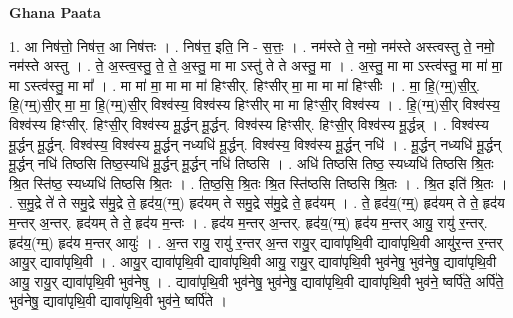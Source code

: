 \documentclass[17pt]{extarticle}
\begin{document}
\textbf{Ghana Paata } \newline

1. आ निष॑त्तो॒ निष॑त्त॒ आ निष॑त्तः । . निष॑त्त॒ इति॒ नि - स॒त्तः॒ । . नम॑स्ते ते॒ नमो॒ नम॑स्ते अस्त्वस्तु ते॒ नमो॒ नम॑स्ते अस्तु । . ते॒ अ॒स्त्व॒स्तु॒ ते॒ ते॒ अ॒स्तु॒ मा मा ऽस्तु॑ ते ते अस्तु॒ मा । . अ॒स्तु॒ मा मा ऽस्त्व॑स्तु॒ मा मा॑ मा॒ मा ऽस्त्व॑स्तु॒ मा मा᳚ । . मा मा॑ मा॒ मा मा मा॑ हिꣳसीर्. हिꣳसीर् मा॒ मा मा मा॑ हिꣳसीः । . मा॒ हि॒(ग्म्॒)सी॒र्॒. हि॒(ग्म्॒)सी॒र् मा॒ मा॒ हि॒(ग्म्॒)सी॒र् विश्व॑स्य॒ विश्व॑स्य हिꣳसीर् मा मा हिꣳसी॒र् विश्व॑स्य । . हि॒(ग्म्॒)सी॒र् विश्व॑स्य॒ विश्व॑स्य हिꣳसीर्. हिꣳसी॒र् विश्व॑स्य मू॒र्द्धन् मू॒र्द्धन्. विश्व॑स्य हिꣳसीर्. हिꣳसी॒र् विश्व॑स्य मू॒र्द्धन्न् । . विश्व॑स्य मू॒र्द्धन् मू॒र्द्धन्. विश्व॑स्य॒ विश्व॑स्य मू॒र्द्धन् नध्यधि॑ मू॒र्द्धन्. विश्व॑स्य॒ विश्व॑स्य मू॒र्द्धन् नधि॑ । . मू॒र्द्धन् नध्यधि॑ मू॒र्द्धन् मू॒र्द्धन् नधि॑ तिष्ठसि तिष्ठ॒स्यधि॑ मू॒र्द्धन् मू॒र्द्धन् नधि॑ तिष्ठसि । . अधि॑ तिष्ठसि तिष्ठ॒ स्यध्यधि॑ तिष्ठसि श्रि॒तः श्रि॒त स्ति॑ष्ठ॒ स्यध्यधि॑ तिष्ठसि श्रि॒तः । . ति॒ष्ठ॒सि॒ श्रि॒तः श्रि॒त स्ति॑ष्ठसि तिष्ठसि श्रि॒तः । . श्रि॒त इति॑ श्रि॒तः । . स॒मु॒द्रे ते॑ ते समु॒द्रे स॑मु॒द्रे ते॒ हृद॑य॒(ग्म्॒) हृद॑यम् ते समु॒द्रे स॑मु॒द्रे ते॒ हृद॑यम् । . ते॒ हृद॑य॒(ग्म्॒) हृद॑यम् ते ते॒ हृद॑य म॒न्तर् अ॒न्तर्. हृद॑यम् ते ते॒ हृद॑य म॒न्तः । . हृद॑य म॒न्तर् अ॒न्तर्. हृद॑य॒(ग्म्॒) हृद॑य म॒न्तर् आयु॒ रायु॑ र॒न्तर्. हृद॑य॒(ग्म्॒) हृद॑य म॒न्तर् आयुः॑ । . अ॒न्त रायु॒ रायु॑ र॒न्तर् अ॒न्त रायु॒र् द्यावा॑पृथि॒वी द्यावा॑पृथि॒वी आयु॑र॒न्त र॒न्तर् आयु॒र् द्यावा॑पृथि॒वी । . आयु॒र् द्यावा॑पृथि॒वी द्यावा॑पृथि॒वी आयु॒ रायु॒र् द्यावा॑पृथि॒वी भुव॑नेषु॒ भुव॑नेषु॒ द्यावा॑पृथि॒वी आयु॒ रायु॒र् द्यावा॑पृथि॒वी भुव॑नेषु । . द्यावा॑पृथि॒वी भुव॑नेषु॒ भुव॑नेषु॒ द्यावा॑पृथि॒वी द्यावा॑पृथि॒वी भुव॑ने॒ ष्वर्पि॑ते॒ अर्पि॑ते॒ भुव॑नेषु॒ द्यावा॑पृथि॒वी द्यावा॑पृथि॒वी भुव॑ने॒ ष्वर्पि॑ते । \newline
\end{document}
